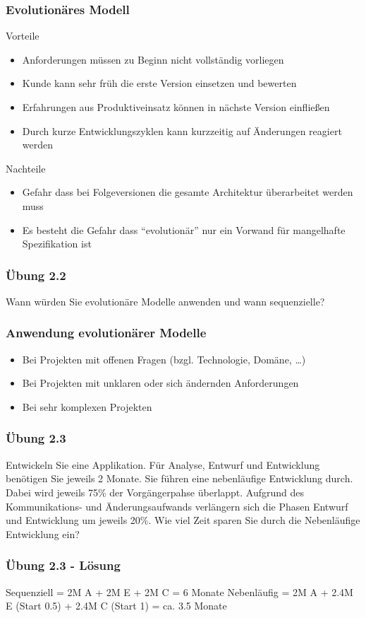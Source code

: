 \begin{frame}
\frametitle{Evolutionäres Modell}
	Vorteile
	\begin{itemize}
		\item Anforderungen müssen zu Beginn nicht vollständig vorliegen
		\item Kunde kann sehr früh die erste Version einsetzen und bewerten
		\item Erfahrungen aus Produktiveinsatz können in nächste Version einfließen
		\item Durch kurze Entwicklungszyklen kann kurzzeitig auf Änderungen reagiert werden
	\end{itemize}
	\bigskip
	Nachteile
	\begin{itemize}
		\item Gefahr dass bei Folgeversionen die gesamte Architektur überarbeitet werden muss
		\item Es besteht die Gefahr dass ``evolutionär'' nur ein Vorwand für mangelhafte
		Spezifikation ist
	\end{itemize}
\end{frame}

\begin{frame}
\frametitle{Übung 2.2}
	Wann würden Sie evolutionäre Modelle anwenden und wann sequenzielle?
\end{frame}

\begin{frame}
\frametitle{Anwendung evolutionärer Modelle}
	\begin{itemize}
		\item Bei Projekten mit offenen Fragen (bzgl. Technologie, Domäne, \ldots)
		\item Bei Projekten mit unklaren oder sich ändernden Anforderungen
		\item Bei sehr komplexen Projekten
	\end{itemize}
\end{frame}

\begin{frame}
\frametitle{Übung 2.3}
	Entwickeln Sie eine Applikation. Für Analyse, Entwurf und Entwicklung benötigen
	Sie jeweils 2 Monate. Sie führen eine nebenläufige Entwicklung durch. Dabei wird
	jeweils 75\% der Vorgängerpahse überlappt. Aufgrund des Kommunikations- und
	Änderungsaufwands verlängern sich die Phasen Entwurf und Entwicklung um jeweils 20\%.
	Wie viel Zeit sparen Sie durch die Nebenläufige Entwicklung ein?
\end{frame}

\ifloesung
\begin{frame}
\frametitle{Übung 2.3 - Lösung}
	Sequenziell = 2M A + 2M E + 2M C = 6 Monate
	\newline
	Nebenläufig = 2M A + 2.4M E (Start 0.5) + 2.4M C (Start 1) = ca. 3.5 Monate
\end{frame}
\fi

